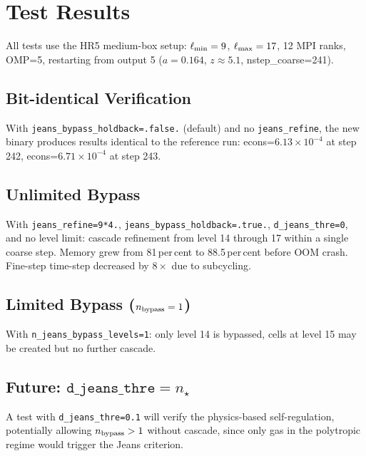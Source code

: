 \documentclass[fleqn,usenatbib]{mnras}
\newcommand{\nstar}{n_\star}
\newcommand{\code}[1]{\texttt{#1}}
\begin{document}
\section{Test Results}
\label{sec:tests}

All tests use the HR5 medium-box setup: $\ell_{\rm min}=9$,
$\ell_{\rm max}=17$, 12 MPI ranks, OMP=5, restarting from output 5
($a=0.164$, $z\approx 5.1$, nstep\_coarse=241).

\subsection{Bit-identical Verification}

With \code{jeans\_bypass\_holdback=.false.} (default) and no
\code{jeans\_refine}, the new binary produces results identical to
the reference run: econs=$6.13\times10^{-4}$ at step 242,
econs=$6.71\times10^{-4}$ at step 243.

\subsection{Unlimited Bypass}

With \code{jeans\_refine=9*4.},
\code{jeans\_bypass\_holdback=.true.}, \code{d\_jeans\_thre=0}, and
no level limit: cascade refinement from level 14 through 17 within a
single coarse step.  Memory grew from 81\,per\,cent to
88.5\,per\,cent before OOM crash.
Fine-step time-step decreased by $8\times$ due to subcycling.

\subsection{Limited Bypass ($n_{\rm bypass}=1$)}

With \code{n\_jeans\_bypass\_levels=1}: only level 14 is bypassed,
cells at level 15 may be created but no further cascade.

\subsection{Future: $\code{d\_jeans\_thre}=\nstar$}

A test with \code{d\_jeans\_thre=0.1} will verify the physics-based
self-regulation, potentially allowing $n_{\rm bypass} > 1$ without
cascade, since only gas in the polytropic regime would trigger the
Jeans criterion.
\end{document}
